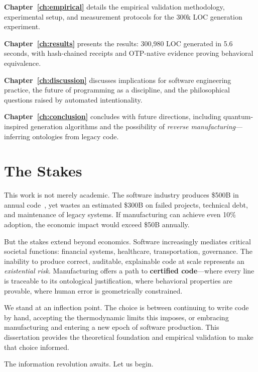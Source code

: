 \textbf{Chapter~\ref{ch:empirical}} details the empirical validation methodology, experimental setup, and measurement protocols for the 300k LOC generation experiment.

\textbf{Chapter~\ref{ch:results}} presents the results: 300,980 LOC generated in 5.6 seconds, with hash-chained receipts and OTP-native evidence proving behavioral equivalence.

\textbf{Chapter~\ref{ch:discussion}} discusses implications for software engineering practice, the future of programming as a discipline, and the philosophical questions raised by automated intentionality.

\textbf{Chapter~\ref{ch:conclusion}} concludes with future directions, including quantum-inspired generation algorithms and the possibility of \textit{reverse manufacturing}---inferring ontologies from legacy code.

\section{The Stakes}

This work is not merely academic. The software industry produces \$500B in annual code~\cite{gartner2023software}, yet wastes an estimated \$300B on failed projects, technical debt, and maintenance of legacy systems. If manufacturing can achieve even 10\% adoption, the economic impact would exceed \$50B annually.

But the stakes extend beyond economics. Software increasingly mediates critical societal functions: financial systems, healthcare, transportation, governance. The inability to produce correct, auditable, explainable code at scale represents an \textit{existential risk}. Manufacturing offers a path to \textbf{certified code}---where every line is traceable to its ontological justification, where behavioral properties are provable, where human error is geometrically constrained.

We stand at an inflection point. The choice is between continuing to write code by hand, accepting the thermodynamic limits this imposes, or embracing manufacturing and entering a new epoch of software production. This dissertation provides the theoretical foundation and empirical validation to make that choice informed.

The information revolution awaits. Let us begin.
